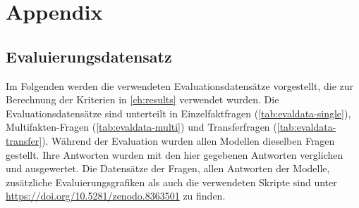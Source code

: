 \chapter*{Appendix}\label{ch:appendix}
\section*{Evaluierungsdatensatz}\label{app:evaldata}
{\normalsize
Im Folgenden werden die verwendeten Evaluationsdatensätze vorgestellt, die zur Berechnung der Kriterien in \cref{ch:results} verwendet wurden.
Die Evaluationsdatensätze sind unterteilt in Einzelfaktfragen (\cref{tab:evaldata-single}), Multifakten-Fragen (\cref{tab:evaldata-multi}) und Transferfragen (\cref{tab:evaldata-transfer}).
Während der Evaluation wurden allen Modellen dieselben Fragen gestellt.
Ihre Antworten wurden mit den hier gegebenen Antworten verglichen und ausgewertet.
Die Datensätze der Fragen, allen Antworten der Modelle, zusätzliche Evaluierungsgrafiken als auch die verwendeten Skripte
sind unter \url{https://doi.org/10.5281/zenodo.8363501} zu finden. \par}

